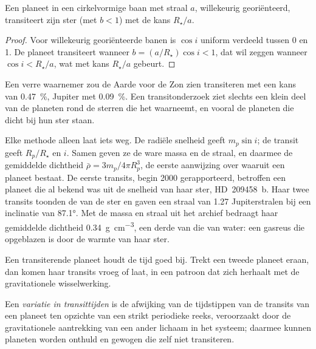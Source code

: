 \begin{proposition}[Transitkans]\label{prop:b3:exoplanets:probability}
Een planeet in een cirkelvormige baan met straal $a$, willekeurig georiënteerd,
transiteert zijn ster (met $b < 1$) met de kans $R_\star/a$.
\end{proposition}

\begin{proof}
Voor willekeurig georiënteerde banen is $\cos i$ uniform verdeeld tussen
0 en 1. De planeet transiteert wanneer $b = (a/R_\star)\cos i < 1$, dat wil zeggen
wanneer $\cos i < R_\star/a$, wat met kans $R_\star/a$ gebeurt.
\end{proof}

Een verre waarnemer zou de Aarde voor de Zon zien transiteren met een kans
van \qty{0.47}{\percent}, Jupiter met \qty{0.09}{\percent}. Een transitonderzoek
ziet slechts een klein deel van de planeten rond de sterren die het
waarneemt, en vooral de planeten die dicht bij hun ster staan.

Elke methode alleen laat iets weg. De radiële snelheid geeft
$m_p\sin i$; de transit geeft $R_p/R_\star$ en $i$. Samen geven ze
de ware massa en de straal, en daarmee de gemiddelde dichtheid
$\bar\rho = 3m_p/4\pi R_p^3$, de eerste aanwijzing over waaruit een planeet bestaat.
De eerste transits, begin 2000 gerapporteerd, betroffen een planeet die
al bekend was uit de snelheid van haar ster, HD~209458~b. Haar twee transits
toonden de  van de ster en gaven een straal van 1.27 Jupiterstralen bij een inclinatie van
\ang{87.1}. Met de massa en straal uit het archief bedraagt haar gemiddelde dichtheid
\qty{0.34}{g.cm^{-3}}, een derde van die van water: een gasreus die opgeblazen is door de
warmte van haar ster.

Een transiterende planeet houdt de tijd goed bij. Trekt een tweede planeet eraan, dan
komen haar transits vroeg of laat, in een patroon dat zich herhaalt met
de gravitationele wisselwerking.

\begin{definition}\label{def:b3:exoplanets:ttv}
Een \emph{variatie in transittijden} is de
afwijking van de tijdstippen van de transits van een planeet ten opzichte van een strikt periodieke
reeks, veroorzaakt door de gravitationele aantrekking van een ander lichaam in het
systeem; daarmee kunnen planeten worden onthuld en gewogen
die zelf niet transiteren.
\end{definition}

